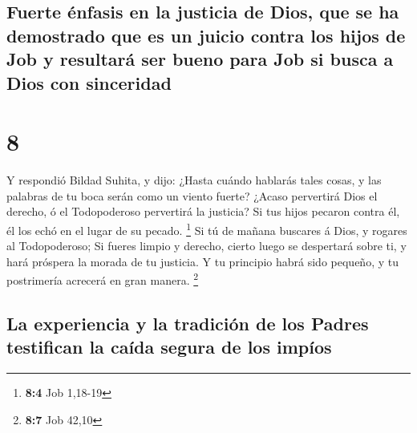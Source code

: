\hypertarget{fuerte-uxe9nfasis-en-la-justicia-de-dios-que-se-ha-demostrado-que-es-un-juicio-contra-los-hijos-de-job-y-resultaruxe1-ser-bueno-para-job-si-busca-a-dios-con-sinceridad}{%
\subsection{Fuerte énfasis en la justicia de Dios, que se ha demostrado
que es un juicio contra los hijos de Job y resultará ser bueno para Job
si busca a Dios con
sinceridad}\label{fuerte-uxe9nfasis-en-la-justicia-de-dios-que-se-ha-demostrado-que-es-un-juicio-contra-los-hijos-de-job-y-resultaruxe1-ser-bueno-para-job-si-busca-a-dios-con-sinceridad}}

\hypertarget{section-7}{%
\section{8}\label{section-7}}

 Y respondió Bildad Suhita, y dijo:  ¿Hasta
cuándo hablarás tales cosas, y las palabras de tu boca serán como un
viento fuerte?  ¿Acaso pervertirá Dios el derecho, ó el
Todopoderoso pervertirá la justicia?  Si tus hijos pecaron
contra él, él los echó en el lugar de su pecado. \footnote{\textbf{8:4}
  Job 1,18-19}  Si tú de mañana buscares á Dios, y rogares
al Todopoderoso;  Si fueres limpio y derecho, cierto luego
se despertará sobre ti, y hará próspera la morada de tu justicia.
 Y tu principio habrá sido pequeño, y tu postrimería
acrecerá en gran manera. \footnote{\textbf{8:7} Job 42,10}

\hypertarget{la-experiencia-y-la-tradiciuxf3n-de-los-padres-testifican-la-cauxedda-segura-de-los-impuxedos}{%
\subsection{La experiencia y la tradición de los Padres testifican la
caída segura de los
impíos}\label{la-experiencia-y-la-tradiciuxf3n-de-los-padres-testifican-la-cauxedda-segura-de-los-impuxedos}}

